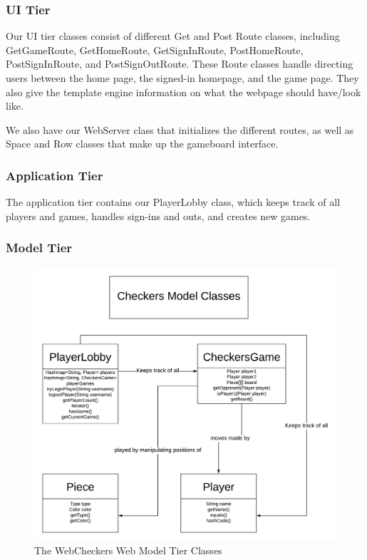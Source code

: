 \documentclass[]{article}
\begin{document}
\hypertarget{ui-tier}{%
\subsubsection{UI Tier}\label{ui-tier}}

Our UI tier classes consist of different Get and Post Route classes,
including GetGameRoute, GetHomeRoute, GetSignInRoute, PostHomeRoute,
PostSignInRoute, and PostSignOutRoute. These Route classes handle
directing users between the home page, the signed-in homepage, and the
game page. They also give the template engine information on what the
webpage should have/look like.

We also have our WebServer class that initializes the different routes,
as well as Space and Row classes that make up the gameboard interface.

\hypertarget{application-tier}{%
\subsubsection{Application Tier}\label{application-tier}}

The application tier contains our PlayerLobby class, which keeps track
of all players and games, handles sign-ins and outs, and creates new
games.

\hypertarget{model-tier}{%
\subsubsection{Model Tier}\label{model-tier}}

\begin{figure}
\centering
\includegraphics{./tex2pdf.1500/21cc542531619e07b766bad5475800a80e6b8a65.png}
\caption{The WebCheckers Web Model Tier Classes}
\end{figure}
\end{document}
